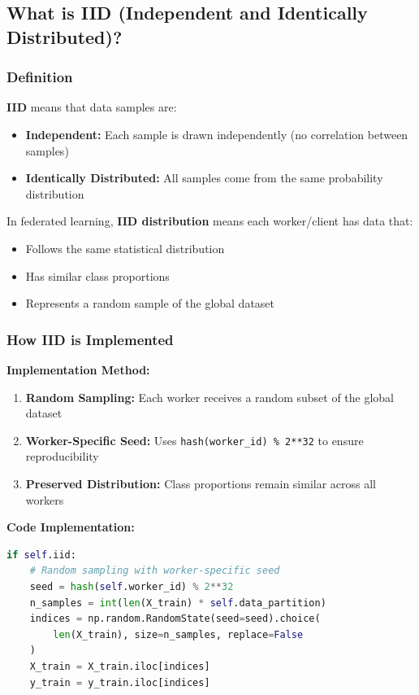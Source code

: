 \documentclass[12pt,a4paper]{article}
\begin{document}
\subsection{What is IID (Independent and Identically Distributed)?}

\subsubsection{Definition}

\textbf{IID} means that data samples are:
\begin{itemize}
    \item \textbf{Independent:} Each sample is drawn independently (no correlation between samples)
    \item \textbf{Identically Distributed:} All samples come from the same probability distribution
\end{itemize}

In federated learning, \textbf{IID distribution} means each worker/client has data that:
\begin{itemize}
    \item Follows the same statistical distribution
    \item Has similar class proportions
    \item Represents a random sample of the global dataset
\end{itemize}

\subsubsection{How IID is Implemented}

\textbf{Implementation Method:}
\begin{enumerate}
    \item \textbf{Random Sampling:} Each worker receives a random subset of the global dataset
    \item \textbf{Worker-Specific Seed:} Uses \texttt{hash(worker\_id) \% 2**32} to ensure reproducibility
    \item \textbf{Preserved Distribution:} Class proportions remain similar across all workers
\end{enumerate}

\textbf{Code Implementation:}
\begin{lstlisting}[language=Python]
if self.iid:
    # Random sampling with worker-specific seed
    seed = hash(self.worker_id) % 2**32
    n_samples = int(len(X_train) * self.data_partition)
    indices = np.random.RandomState(seed=seed).choice(
        len(X_train), size=n_samples, replace=False
    )
    X_train = X_train.iloc[indices]
    y_train = y_train.iloc[indices]
\end{lstlisting}
\end{document}
